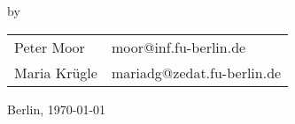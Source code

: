 \documentclass[11pt,a4paper]{article}
\begin{document}
\parindent0pt


\vspace{4cm}
\begin{center}

by
\vspace{1cm}

\begin{center}
\begin{tabular}{l l } 

Peter Moor 			&moor@inf.fu-berlin.de\\
Maria Krügle		&mariadg@zedat.fu-berlin.de\\
\end{tabular}
\end{center}

\end{center}
\vspace{4cm}

\begin{center}Berlin, \today \end{center}

\newpage

\tableofcontents

\newpage





\newpage


\newpage


\newpage


\newpage




 
\end{document}

